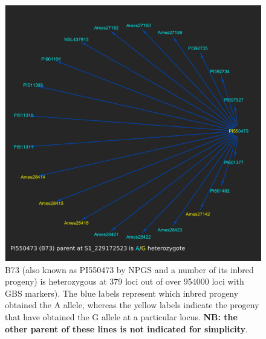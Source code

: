 \documentclass[12pt]{article}
\begin{document}
\begin{figure}[p]
\includegraphics[width=1.0\linewidth]{Pruned.pdf}
\caption{B73 (also known as PI550473 by NPGS and a number of its inbred progeny) is heterozygous at 379 loci out of over 954000 loci with GBS markers). The blue labels represent which inbred progeny obtained the A allele, whereas the yellow labels indicate the progeny that have obtained the G allele at a particular locus. \textbf{NB: the other parent of these lines is not indicated for simplicity}.}
\label{fig:alleledrop}
\end{figure}
\end{document}
